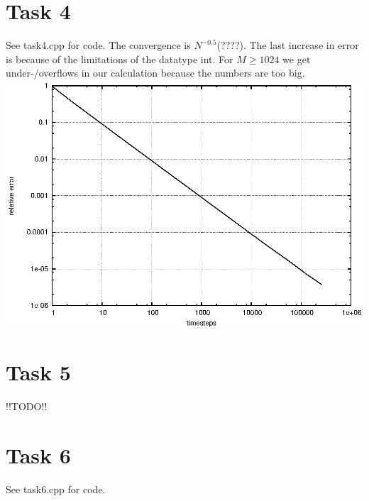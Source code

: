 \documentclass[]{article}
\begin{document}
\section*{Task 4}
See task4.cpp for code. The convergence is $N^{-0.5}$(????). The last increase in error is because of the limitations of the datatype int. For $M\ge 1024$ we get under-/overflows in our calculation because the numbers are too big.
\\
\includegraphics{task4.eps}\\

\section*{Task 5}
!!TODO!!

\section*{Task 6}
See task6.cpp for code.
\end{document}
